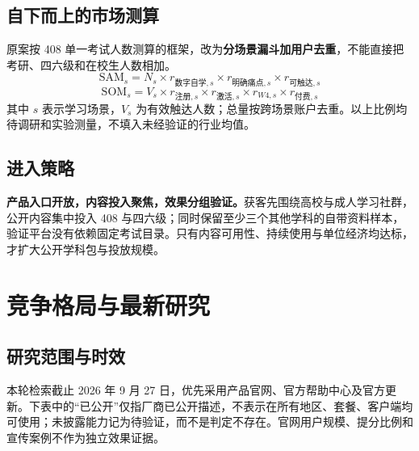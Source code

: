 \documentclass[UTF8,a4paper,11pt,fontset=none]{ctexart}
\newcommand{\newsec}[1]{\clearpage\section{#1}}
\begin{document}
\subsection{自下而上的市场测算}
原案按 408 单一考试人数测算的框架，改为\textbf{分场景漏斗加用户去重}，不能直接把考研、四六级和在校生人数相加。\cite{original}
\[
\mathrm{SAM}_{s}=N_s\times r_{\text{数字自学},s}\times r_{\text{明确痛点},s}\times r_{\text{可触达},s}
\]
\[
\mathrm{SOM}_{s}=V_s\times r_{\text{注册},s}\times r_{\text{激活},s}\times r_{W4,s}\times r_{\text{付费},s}
\]
其中 $s$ 表示学习场景，$V_s$ 为有效触达人数；总量按跨场景账户去重。以上比例均待调研和实验测量，不填入未经验证的行业均值。

\subsection{进入策略}
\textbf{产品入口开放，内容投入聚焦，效果分组验证。}获客先围绕高校与成人学习社群，公开内容集中投入 408 与四六级；同时保留至少三个其他学科的自带资料样本，验证平台没有依赖固定考试目录。只有内容可用性、持续使用与单位经济均达标，才扩大公开学科包与投放规模。

\newsec{竞争格局与最新研究}
\subsection{研究范围与时效}
本轮检索截止 2026 年 9 月 27 日，优先采用产品官网、官方帮助中心及官方更新。下表中的“已公开”仅指厂商已公开描述，不表示在所有地区、套餐、客户端均可使用；未披露能力记为待验证，而不是判定不存在。官网用户规模、提分比例和宣传案例不作为独立效果证据。
\end{document}
